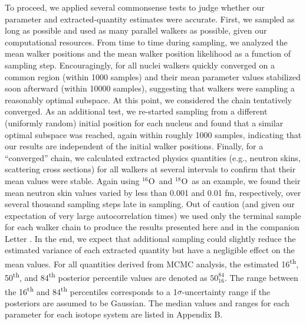\documentclass[twocolumn,secnumarabic,amssymb, nobibnotes, aps, prl,
superscriptaddress, nobalancelastpage, floatfix]{revtex4}
\newcommand{\oSix}{\ensuremath{^{16}}O}
\newcommand{\oEight}{\ensuremath{^{18}}O}
\begin{document}
To proceed, we applied several commonsense tests to
judge whether our parameter and extracted-quantity estimates were accurate.
First, we sampled as long as possible and used as many parallel walkers as
possible, given our computational resources. From time to time during sampling,
we analyzed the mean walker positions and the mean walker position likelihood
as a function of sampling step. Encouragingly, for all nuclei walkers quickly
converged on a common region (within 1000 samples) and their mean parameter
values stabilized soon afterward (within 10000 samples), suggesting that walkers
were sampling a reasonably optimal subspace. At this point, we considered the chain
tentatively converged. As an additional test, we re-started sampling from a different
(uniformly random) initial position for each nucleus and found that a similar
optimal subspace was reached, again within roughly 1000 samples, indicating that
our results are independent of the initial walker positions. Finally, for a
``converged'' chain, we calculated extracted physics quantities (e.g., neutron
skins, scattering cross sections) for all walkers at several intervals
to confirm that their mean values were stable. Again using \oSix\ and \oEight\ as
an example, we found their mean neutron skin values varied by less
than 0.001 and 0.01 fm, respectively, over several thousand sampling steps late
in sampling. Out of caution (and given our expectation of very large autocorrelation times)
we used only the terminal sample for each walker chain to produce
the results presented here and in the companion Letter \cite{Pruitt2020PRL}.
In the end, we expect that additional sampling could slightly
reduce the estimated variance of each extracted quantity but have a negligible
effect on the mean values. For all quantities derived from MCMC analysis, the estimated
16\textsuperscript{th}, 50\textsuperscript{th}, and 84\textsuperscript{th} posterior percentile
values are denoted as $50^{84}_{16}$. The range between the 16\textsuperscript{th} and
84\textsuperscript{th} percentiles corresponds to a 1$\sigma$-uncertainty range if the posteriors
are assumed to be Gaussian. The median values and ranges for each parameter for each isotope
system are listed in Appendix B.
\end{document}
